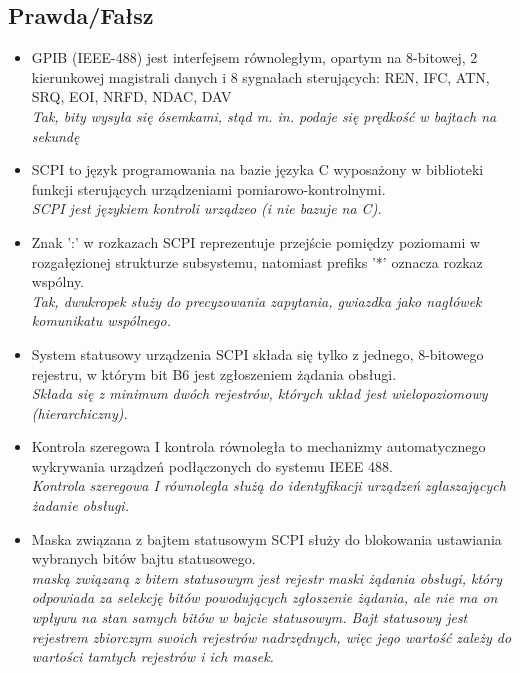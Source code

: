 \documentclass[a4paper,twoside]{article}
\begin{document}
\subsection*{Prawda/Fałsz}
\begin{itemize}
	
	\item \textcolor{tak}{GPIB (IEEE-488) jest interfejsem równoległym, opartym na 8-bitowej, 2 kierunkowej magistrali danych i 8 sygnałach sterujących: REN, IFC, ATN, SRQ, EOI, NRFD, NDAC, DAV} \\
	{\small \emph{Tak, bity wysyła się ósemkami, stąd m. in. podaje się prędkość w bajtach na sekundę}}
	
	\item \textcolor{nie}{SCPI to język programowania na bazie języka C wyposażony w biblioteki funkcji sterujących urządzeniami pomiarowo-kontrolnymi.} \\
	{\small \emph{SCPI jest językiem kontroli urządzeo (i nie bazuje na C).}}
	
	\item \textcolor{tak}{Znak ':' w rozkazach SCPI reprezentuje przejście pomiędzy poziomami w rozgałęzionej strukturze subsystemu, natomiast prefiks '*' oznacza rozkaz wspólny.} \\
	{\small \emph{Tak, dwukropek służy do precyzowania zapytania, gwiazdka jako nagłówek komunikatu wspólnego.}}
	
	\item \textcolor{nie}{System statusowy urządzenia SCPI składa się tylko z jednego, 8-bitowego rejestru, w którym bit B6 jest zgłoszeniem żądania obsługi.} \\
	{\small \emph{Składa się z minimum dwóch rejestrów, których układ jest wielopoziomowy (hierarchiczny).}}
	
	\item \textcolor{nie}{Kontrola szeregowa I kontrola równoległa to mechanizmy automatycznego wykrywania urządzeń podłączonych do systemu IEEE 488.} \\
	{\small \emph{Kontrola szeregowa I równoległa służą do identyfikacji urządzeń zgłaszających żadanie obsługi.}}
	
	\item \textcolor{nie}{Maska związana z bajtem statusowym SCPI służy do blokowania ustawiania wybranych bitów bajtu statusowego.} \\
	{\small \emph{maską związaną z bitem statusowym jest rejestr maski żądania obsługi, który odpowiada za selekcję bitów powodujących zgłoszenie żądania, ale nie ma on wpływu na stan samych bitów w bajcie statusowym. Bajt statusowy jest rejestrem zbiorczym swoich rejestrów nadrzędnych, więc jego wartość zależy do wartości tamtych rejestrów i ich masek.}}
	
\end{itemize}
\end{document}
